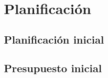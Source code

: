 \chapter{Planificación}\label{chap:planif}
\section{Planificación inicial}\label{sec:planif}

\section{Presupuesto inicial}\label{sec:presupuesto}
